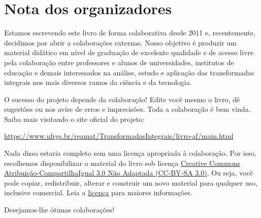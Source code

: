
\chapter*{Nota dos organizadores}

Estamos escrevendo este livro de forma colaborativa desde 2011 e, recentemente, decidimos por abrir a colaborações externas. Nosso objetivo é produzir um material didático em nível de graduação de excelente qualidade e de acesso livre pela colaboração entre professores e alunos de universidades, institutos de educação e demais interessados na análise, estudo e aplicação das transformadas integrais nos mais diversos ramos da ciência e da tecnologia.

O sucesso do projeto depende da colaboração! Edite você mesmo o livro, dê sugestões ou nos avise de erros e imprecisões. Toda a colaboração é bem vinda. Saiba mais visitando o site oficial do projeto:
\begin{center}
  \url{https://www.ufrgs.br/reamat/TransformadasIntegrais/livro-af/main.html} 
  \end{center}


Nada disso estaria completo sem uma licença apropriada à colaboração. Por isso, escolhemos disponibilizar o material do livro sob licença \href{https://creativecommons.org/licenses/by-sa/3.0/}{Creative Commons Atribuição-CompartilhaIgual 3.0 Não Adaptada (CC-BY-SA 3.0)}. Ou seja, você pode copiar, redistribuir, alterar e construir um novo material para qualquer uso, inclusive comercial. Leia a \href{https://creativecommons.org/licenses/by-sa/3.0/}{licença} para maiores informações.

\vspace{0.5cm}

Desejamos-lhe ótimas colaborações!

